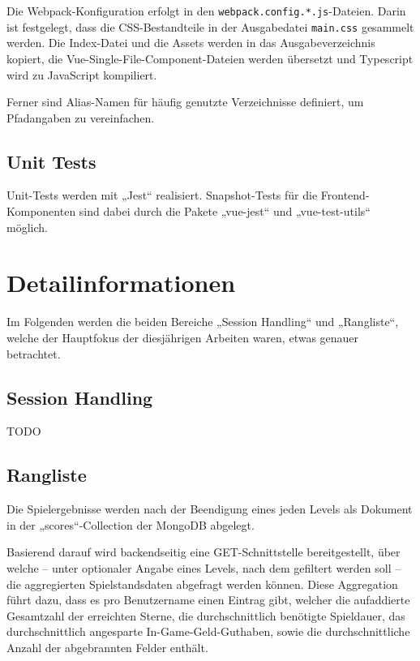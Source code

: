 \documentclass[letterpaper, 10 pt, conference]{ieeeconf}
\begin{document}
Die Webpack-Konfiguration erfolgt in den \texttt{webpack.config.*.js}-Dateien.
Darin ist festgelegt, dass die CSS-Bestandteile in der Ausgabedatei \texttt{main.css} gesammelt werden.
Die Index-Datei und die Assets werden in das Ausgabeverzeichnis kopiert, die Vue-Single-File-Component-Dateien werden übersetzt
und Typescript wird zu JavaScript kompiliert.

Ferner sind Alias-Namen für häufig genutzte Verzeichnisse definiert, um Pfadangaben zu vereinfachen.

\subsection{Unit Tests}

Unit-Tests werden mit „Jest“ realisiert.
Snapshot-Tests für die Frontend-Komponenten sind dabei durch die Pakete „vue-jest“ und „vue-test-utils“ möglich.

\section{Detailinformationen}

Im Folgenden werden die beiden Bereiche „Session Handling“ und „Rangliste“, welche der Hauptfokus der diesjährigen Arbeiten waren, etwas genauer betrachtet.

\subsection{Session Handling}

TODO

\subsection{Rangliste}

Die Spielergebnisse werden nach der Beendigung eines jeden Levels als Dokument in der „scores“-Collection der MongoDB abgelegt.

Basierend darauf wird backendseitig eine GET-Schnittstelle bereitgestellt,
über welche – unter optionaler Angabe eines Levels, nach dem gefiltert werden soll – die aggregierten Spielstandsdaten abgefragt werden können.
Diese Aggregation führt dazu, dass es pro Benutzername einen Eintrag gibt, welcher die aufaddierte Gesamtzahl der erreichten Sterne,
die durchschnittlich benötigte Spieldauer, das durchschnittlich angesparte In-Game-Geld-Guthaben, sowie die durchschnittliche Anzahl der abgebrannten Felder enthält.
\end{document}
